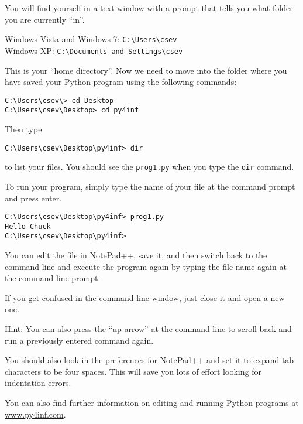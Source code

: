 You will find yourself in a text window with a prompt that
tells you what folder you are currently ``in''.  

Windows Vista and Windows-7: {\tt C:{\textbackslash}Users{\textbackslash}csev}\\
Windows XP: {\tt C:{\textbackslash}Documents and Settings{\textbackslash}csev}

This is your ``home directory''.  Now we need to move into 
the folder where you have saved your Python program using
the following commands:

\beforeverb
\begin{verbatim}
C:\Users\csev\> cd Desktop
C:\Users\csev\Desktop> cd py4inf
\end{verbatim}
\afterverb
%
Then type 

\beforeverb
\begin{verbatim}
C:\Users\csev\Desktop\py4inf> dir 
\end{verbatim}
\afterverb
%
to list your files.  You should see the {\tt prog1.py} when 
you type the {\tt dir} command.

To run your program, simply type the name of your file at the 
command prompt and press enter.

\beforeverb
\begin{verbatim}
C:\Users\csev\Desktop\py4inf> prog1.py
Hello Chuck
C:\Users\csev\Desktop\py4inf> 
\end{verbatim}
\afterverb
%
You can edit the file in NotePad++, save it, and then switch back
to the command line and execute the program again by typing
the file name again at the command-line prompt.

If you get confused in the command-line window, just close it
and open a new one.

Hint: You can also press the ``up arrow'' at the command line to 
scroll back and run a previously entered command again.

You should also look in the preferences for NotePad++ and set it 
to expand tab characters to be four spaces.  This will save you lots
of effort looking for indentation errors.

You can also find further information on editing and running 
Python programs at \url{www.py4inf.com}.

